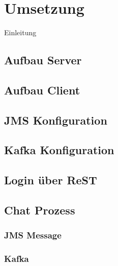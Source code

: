 \documentclass[10pt,journal,compsoc]{IEEEtran}
\begin{document}
\section{Umsetzung}
Einleitung
\subsection{Aufbau Server}

\subsection{Aufbau Client}

\subsection{JMS Konfiguration}

\subsection{Kafka Konfiguration}

\subsection{Login über ReST}

\subsection{Chat Prozess}

\subsubsection{JMS Message}

\subsubsection{Kafka}


\end{document}
